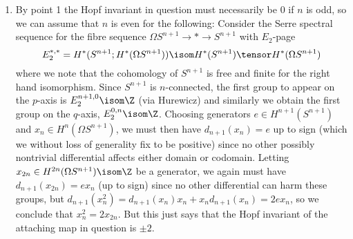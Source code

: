 \begin{solution}
\begin{enumerate}
		\item By point 1 the Hopf invariant in question must necessarily be 0 if $n$ is odd, so we can assume that $n$ is even for the following:
			Consider the Serre spectral sequence for the fibre sequence $\Omega S^{n + 1} \to * \to S^{n + 1}$ with $E_2$-page
			\begin{equation*}
				E_2^{*, *} = H^*(S^{n + 1}; H^*(\Omega S^{n + 1})) \isom H^*(S^{n + 1}) \tensor H^*(\Omega S^{n + 1})
			\end{equation*}
			where we note that the cohomology of $S^{n + 1}$ is free and finite for the right hand isomorphism.
			Since $S^{n + 1}$ is $n$-connected, the first group to appear on the $p$-axis is $E_2^{n + 1, 0} \isom \Z$ (via Hurewicz) and similarly we obtain the first group on the $q$-axis, $E_2^{0, n} \isom \Z$.
			Choosing generators $e \in H^{n + 1}(S^{n + 1})$ and $x_n \in H^n(\Omega S^{n + 1})$, we must then have $d_{n + 1}(x_n) = e$ up to sign (which we without loss of generality fix to be positive) since no other possibly nontrivial differential affects either domain or codomain.
			Letting $x_{2n} \in H^{2n}(\Omega S^{n + 1}) \isom \Z$ be a generator, we again must have $d_{n + 1}(x_{2n}) = e x_n$ (up to sign) since no other differential can harm these groups, but $d_{n + 1}(x_n^2) = d_{n + 1}(x_n) x_n + x_n d_{n + 1}(x_n) = 2 e x_n$, so we conclude that $x_n^2 = 2 x_{2n}$.
			But this just says that the Hopf invariant of the attaching map in question is $\pm 2$.
			\qedhere
	\end{enumerate}
\end{solution}

